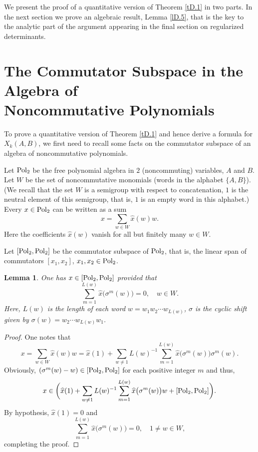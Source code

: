 \documentclass[reqno,10pt,centertags]{amsart}
\newcommand{\lb}{\label}
\newcommand{\hatt}{\widehat}
\numberwithin{equation}{section}
\newtheorem{lemma}[theorem]{Lemma}
\theoremstyle{remark}
\begin{document}
We present the proof of a quantitative version of Theorem \ref{tD.1} in two parts. In the next section we prove an algebraic result, Lemma \ref{lD.5}, that is the key to the analytic part of the argument
appearing in the final section on regularized determinants. 


\section{The Commutator Subspace in the Algebra of \\ Noncommutative Polynomials} \lb{s2}

To prove a quantitative version of Theorem \ref{tD.1} and hence derive a formula for $X_k(A,B)$, we first need to recall some facts on the commutator subspace of an algebra of noncommutative polynomials. 

Let ${\rm Pol_2}$ be the free polynomial algebra in $2$ (noncommuting) variables, $A$ and $B$. Let $W$ be the set of noncommutative monomials (words in the alphabet $\{A,B\}$). (We recall that the set $W$ is a semigroup with respect to concatenation, $1$ is the neutral element of this semigroup, that is, $1$ is an empty word in this alphabet.) Every $x\in{\rm Pol_2}$ can be written as a sum
\begin{equation}
x=\sum_{w\in W}\hatt{x}(w)w.
\end{equation} 
Here the coefficients $\hatt{x}(w)$ vanish for all but finitely many $w\in W$. 

Let $[{\rm Pol_2},{\rm Pol_2}]$ be the commutator subspace of ${\rm Pol_2}$, that is, the linear span of commutators $[x_1,x_2]$, $x_1,x_2\in{\rm Pol_2}$. 

\begin{lemma} \lb{lD.2} 
One has $x\in[{\rm Pol_2},{\rm Pol_2}]$ provided that
\begin{equation} 
\sum_{m=1}^{L(w)}\hatt{x}\bigl(\sigma^m(w)\bigr)=0,\quad w\in W.
\end{equation} 
Here, 
$L(w)$ is the length of each word $w = w_1 w_2\cdots w_{L(w)}$,
$\sigma$ is the cyclic shift given by $\sigma(w)=w_2\cdots w_{L(w)}w_1$.  
\end{lemma}
\begin{proof} One notes that 
\begin{equation} 
x=\sum_{w\in W}\hatt{x}(w)w=\hatt{x}(1)+\sum_{w\neq1} L(w)^{-1}
\sum_{m=1}^{L(w)}\hatt{x}\bigl(\sigma^m(w)\bigr)\sigma^m(w).
\end{equation} 
Obviously, $(\sigma^m(w)-w)\in[{\rm Pol_2},{\rm Pol_2}]$ for each positive integer $m$ and thus,
\begin{equation} 
x\in \bigg(\hatt{x}(1)+\sum_{w\neq1} L(w)^{-1}\sum_{m=1}^{L(w)}\hatt{x}\bigl(\sigma^m(w)\bigr)w+[{\rm Pol_2},{\rm Pol_2}]\bigg).
\end{equation} 
By hypothesis, $\hatt{x}(1)=0$ and
\begin{equation} 
\sum_{m=1}^{L(w)}\hatt{x}\bigl(\sigma^m(w)\bigr)=0,\quad 1\neq w\in W,
\end{equation} 
completing the proof.
\end{proof}
\end{document}

